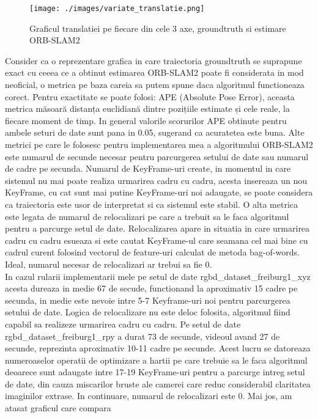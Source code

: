 \documentclass[12pt,a4paper]{report}
\begin{document}
\begin{figure}[htbp] 
  \centering
  \texttt{[image: ./images/variate\_translatie.png]}
  \caption{Graficul translatiei pe fiecare din cele 3 axe, groundtruth si estimare ORB-SLAM2}
  \label{fig:exemplu_imagine}
\end{figure}
Consider ca o reprezentare grafica in care traiectoria groundtruth se suprapune exact cu
ceeea ce a obtinut estimarea ORB-SLAM2 poate fi considerata in mod neoficial, o metrica
pe baza careia sa putem spune daca algoritmul functioneaza corect. Pentru exactitate 
se poate folosi: APE (Absolute Pose Error), aceasta metrica măsoară distanța euclidiană 
dintre pozițiile estimate și cele reale, la fiecare moment de timp.
In general valorile scorurilor APE obtinute pentru ambele seturi de date sunt pana in 0.05,
sugerand ca acuratetea este buna. Alte metrici pe care le folosesc pentru implementarea 
mea a algoritmului ORB-SLAM2 este numarul de secunde necesar pentru parcurgerea setului de 
date sau numarul de cadre pe secunda. Numarul de KeyFrame-uri create, in momentul in care 
sistemul nu mai poate realiza urmarirea cadru cu cadru, acesta insereaza un nou KeyFrame,
cu cat sunt mai putine KeyFrame-uri noi adaugate, se poate considera ca traiectoria este 
usor de interpretat si ca sistemul este stabil. O alta metrica este legata de numarul 
de relocalizari pe care a trebuit sa le faca algoritmul pentru a parcurge setul de date.
Relocalizarea apare in situatia in care urmarirea cadru cu cadru esueaza si este cautat 
KeyFrame-ul care seamana cel mai bine cu cadrul curent folosind vectorul de feature-uri 
calculat de metoda bag-of-words. Ideal, numarul necesar de relocalizari ar trebui sa fie 0.\\
In cazul rularii implementarii mele pe setul de date rgbd\_dataset\_freiburg1\_xyz acesta 
dureaza in medie 67 de secude, functionand la aproximativ 15 cadre pe secunda, in medie 
este nevoie intre 5{-}7 Keyframe-uri noi pentru parcurgerea setului de date. Logica 
de relocalizare nu este deloc folosita, algoritmul fiind capabil sa realizeze urmarirea
cadru cu cadru.
Pe setul de date rgbd\_dataset\_freiburg1\_rpy a durat 73 de secunde, videoul avand 
27 de secunde, reprezinta aproximativ 10{-}11 cadre pe secunde. Acest lucru se datoreaza 
numeroaselor operatii de optimizare a hartii pe care trebuie sa le faca algoritmul deoarece 
sunt adaugate intre 17{-}19 KeyFrame-uri pentru a parcurge intreg setul de date, din cauza 
miscarilor bruste ale camerei care reduc considerabil claritatea imaginilor extrase.
In continuare, numarul de relocalizari este 0. Mai jos, am atasat graficul care compara 
\end{document}
